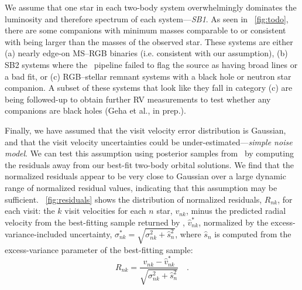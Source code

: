 \documentclass[modern, letterpaper]{aastex62}
\newcommand{\apogee}{\project{\acronym{APOGEE}}}
\newcommand{\thejoker}{\project{The~Joker}}
\begin{document}
We assume that one star in each two-body system overwhelmingly dominates the
luminosity and therefore spectrum of each system---\emph{SB1}.
As seen in \figurename~\ref{fig:todo}, there are some companions with minimum
masses comparable to or consistent with being larger than the masses of the
observed star.
These systems are either (a) nearly edge-on MS--RGB binaries (i.e. consistent
with our assumption), (b) SB2 systems where the \apogee\ pipeline failed to flag
the source as having broad lines or a bad fit, or (c) RGB--stellar remnant
systems with a black hole or neutron star companion.
A subset of these systems that look like they fall in category (c) are being
followed-up to obtain further RV measurements to test whether any companions are
black holes (Geha et al., in prep.).

Finally, we have assumed that the visit velocity error distribution is Gaussian,
and that the visit velocity uncertainties could be
under-estimated---\emph{simple noise model}.
We can test this assumption using posterior samples from \thejoker\ by computing
the residuals away from our best-fit two-body orbital solutions.
We find that the normalized residuals appear to be very close to Gaussian over a
large dynamic range of normalized residual values, indicating that this
assumption may be sufficient.
\figurename~\ref{fig:residuals} shows the distribution of normalized residuals,
$R_{nk}$, for each visit: the $k$ visit velocities for each $n$ star, $v_{nk}$,
minus the predicted radial velocity from the best-fitting sample returned by
\thejoker, $\hat{v}^*_{nk}$, normalized by the excess-variance-included
uncertainty, $\sigma_{nk}^* = \sqrt{\sigma_{nk}^2 + \hat{s}_{n}^2}$, where
$\hat{s}_{n}$ is computed from the excess-variance parameter of the best-fitting
sample:
\begin{equation}
    R_{nk} = \frac{v_{nk} - \hat{v}^*_{nk}}{\sqrt{\sigma_{nk}^2 +
    \hat{s}_{n}^2}} \quad . \label{eq:normresid}
\end{equation}
\end{document}
